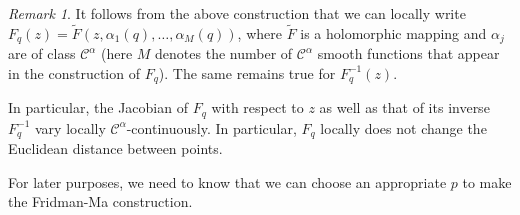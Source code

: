 \documentclass[a4paper,12pt]{amsart}
\theoremstyle{remark}\newtheorem{remark}[theorem]{Remark}
\begin{document}
\begin{remark}\label{remhol}
It follows from the above construction that we can locally write $F_q(z)=\tilde F(z, \alpha_1(q),\ldots, \alpha_M(q))$, where $\tilde F$ is a holomorphic mapping and $\alpha_j$ are of class $\mathcal C^{\alpha}$ (here $M$ denotes the number of $\mathcal C^\alpha$ smooth functions that appear in the construction of $F_q$). The same remains true for $F_q^{-1}(z)$.

In particular, the Jacobian of $F_q$ with respect to $z$ as well as 
that of its inverse $F_q^{-1}$ vary locally $\mathcal C^\alpha$-continuously. In particular, $F_q$ locally does not change the Euclidean distance between points.
\end{remark}

For later purposes, we need to know that we can choose an appropriate $p$
to make the Fridman-Ma construction.
\end{document}
